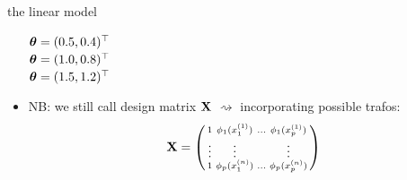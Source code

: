 \documentclass[11pt,compress,t,notes=noshow, xcolor=table]{beamer}
\begin{document}
\begin{vbframe}{the linear model}
\begin{itemize}
\begin{minipage}[b]{0.2\textwidth}
  \tiny \raggedleft
  \textcolor{blue}{$\bm{\theta} = (0.5, 0.4)^\top$} \\
  \textcolor{orange}{$\bm{\theta} = (1.0, 0.8)^\top$} \\
  \textcolor{magenta}{$\bm{\theta} = (1.5, 1.2)^\top$} \\
  \vspace{0.1cm}
\end{minipage}

\vfill

\item NB: we still call design matrix $\mathbf{X}$ $\rightsquigarrow$ 
incorporating possible trafos:
\begin{align*}
  \mathbf{X} = 
  \left(
    \begin{smallmatrix}
        1 & \textcolor{black}{\phi_1} (x^{(1)}_1) & \ldots & 
        \textcolor{black}{\phi_1} (x^{(1)}_p) \\
        \vdots & \vdots & & \vdots \\
        1 & \textcolor{black}{\phi_p} (x^{(n)}_1) & \ldots & 
        \textcolor{black}{\phi_p} (x^{(n)}_p) \\
    \end{smallmatrix}
    \right)
\end{align*}
\end{itemize}

\end{vbframe}

\end{document}
